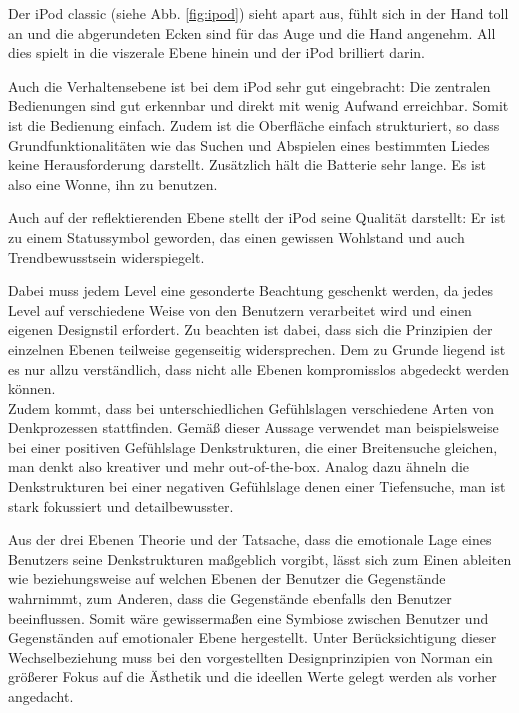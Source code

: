 \documentclass[parskip,headsepline, headtopline, %
footsepline, oneside, 12pt, headings=small]{scrreprt}
\begin{document}

Der iPod classic (siehe Abb. \ref{fig:ipod}) sieht apart aus, fühlt sich in der Hand toll an und die abgerundeten Ecken sind für das Auge und die Hand angenehm. All dies spielt in die viszerale Ebene hinein und der iPod brilliert darin.

Auch die Verhaltensebene ist bei dem iPod sehr gut eingebracht: Die zentralen Bedienungen sind gut erkennbar und direkt mit wenig Aufwand erreichbar. Somit ist die Bedienung einfach. Zudem ist die Oberfläche einfach strukturiert, so dass Grundfunktionalitäten wie das Suchen und Abspielen eines bestimmten Liedes keine Herausforderung darstellt. Zusätzlich hält die Batterie sehr lange. Es ist also eine Wonne, ihn zu benutzen.

Auch auf der reflektierenden Ebene stellt der iPod seine Qualität darstellt: Er ist zu einem Statussymbol geworden, das einen gewissen Wohlstand und auch Trendbewusstsein widerspiegelt. 


Dabei muss jedem Level eine gesonderte Beachtung geschenkt werden, da jedes Level auf verschiedene Weise von den Benutzern verarbeitet wird und einen eigenen Designstil erfordert. 
Zu beachten ist dabei, dass sich die Prinzipien der einzelnen Ebenen teilweise gegenseitig widersprechen. Dem zu Grunde liegend ist es nur allzu verständlich, dass nicht alle Ebenen kompromisslos abgedeckt werden können. \\
Zudem kommt, dass bei unterschiedlichen Gefühlslagen verschiedene Arten von Denkprozessen stattfinden. Gemäß dieser Aussage verwendet man beispielsweise bei einer positiven Gefühlslage Denkstrukturen, die einer Breitensuche gleichen, man denkt also kreativer und mehr out-of-the-box. Analog dazu ähneln die Denkstrukturen bei einer negativen Gefühlslage denen einer Tiefensuche, man ist stark fokussiert und detailbewusster.

Aus der drei Ebenen Theorie und der Tatsache, dass die emotionale Lage eines Benutzers seine Denkstrukturen maßgeblich vorgibt, lässt sich zum Einen ableiten wie beziehungsweise auf welchen Ebenen der Benutzer die Gegenstände wahrnimmt, zum Anderen, dass die Gegenstände ebenfalls den Benutzer beeinflussen. Somit wäre gewissermaßen eine Symbiose zwischen Benutzer und Gegenständen auf emotionaler Ebene hergestellt. Unter Berücksichtigung dieser Wechselbeziehung muss bei den vorgestellten Designprinzipien von Norman ein größerer Fokus auf die Ästhetik und die ideellen Werte gelegt werden als vorher angedacht.
\end{document}
